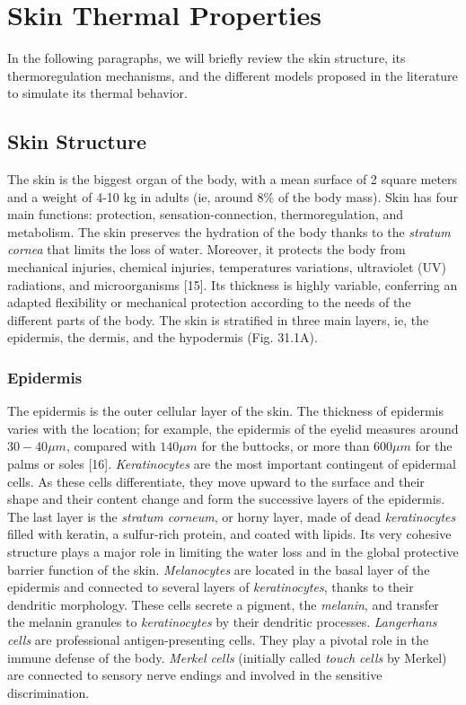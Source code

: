 
\section*{Skin Thermal Properties}

In the following paragraphs, we will briefly review the skin structure, its
thermoregulation mechanisms, and the different models proposed in the literature
to simulate its thermal behavior.

\subsection*{Skin Structure}

The skin is the biggest organ of the body, with a mean surface of 2 square meters
and a weight of 4-10 kg in adults (ie, around 8\% of the body mass). Skin has four
main functions: protection, sensation-connection, thermoregulation, and metabolism.
The skin preserves the hydration of the body thanks to the \textit{stratum cornea} that
limits the loss of water. Moreover, it protects the body from mechanical injuries,
chemical injuries, temperatures variations, ultraviolet (UV) radiations, and
microorganisms [15]. Its thickness is highly variable, conferring an adapted
flexibility or mechanical protection according to the needs of the different parts
of the body. The skin is stratified in three main layers, ie, the epidermis, the
dermis, and the hypodermis (Fig. 31.1A).

\subsubsection*{Epidermis}

The epidermis is the outer cellular layer of the skin. The thickness of epidermis
varies with the location; for example, the epidermis of the eyelid measures around
$30-40 \mu m$, compared with $140 \mu m$ for the buttocks, or more than $600 \mu m$
for the palms or soles [16]. \textit{Keratinocytes} are the most important contingent of
epidermal cells. As these cells differentiate, they move upward to the surface and
their shape and their content change and form the successive layers of the
epidermis. The last layer is the \textit{stratum corneum}, or horny layer, made of dead
\textit{keratinocytes} filled with keratin, a sulfur-rich protein, and coated with lipids.
Its very cohesive structure plays a major role in limiting the water loss and in
the global protective barrier function of the skin. \textit{Melanocytes} are located
in the basal layer of the epidermis and connected to several layers of \textit{keratinocytes},
thanks to their dendritic morphology. These cells secrete a pigment, the \textit{melanin},
and transfer the melanin granules to \textit{keratinocytes} by their dendritic
processes. \textit{Langerhans cells} are professional antigen-presenting cells. They
play a pivotal role in the immune defense of the body. \textit{Merkel cells} (initially
called \textit{touch cells} by Merkel) are connected to sensory nerve endings and
involved in the sensitive discrimination.

